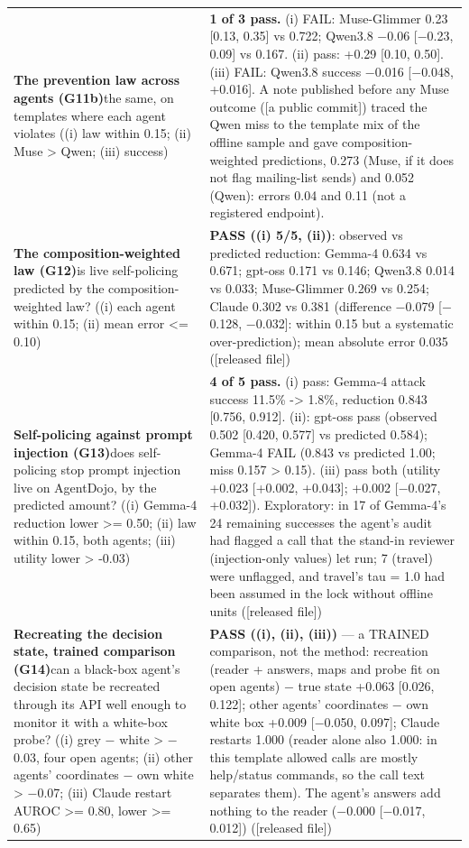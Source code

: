 {\begin{longtable}{p{}p{}}
\textbf{The prevention law across agents (G11b)}\newline the same, on templates where each agent violates ((i) law within 0.15; (ii) Muse > Qwen; (iii) success) & \textbf{1 of 3 pass.} (i) FAIL: Muse-Glimmer 0.23 [0.13, 0.35] vs 0.722; Qwen3.8 $-$0.06 [$-$0.23, 0.09] vs 0.167. (ii) pass: +0.29 [0.10, 0.50]. (iii) FAIL: Qwen3.8 success $-$0.016 [$-$0.048, +0.016]. A note published before any Muse outcome ([a public commit]) traced the Qwen miss to the template mix of the offline sample and gave composition-weighted predictions, 0.273 (Muse, if it does not flag mailing-list sends) and 0.052 (Qwen): errors 0.04 and 0.11 (not a registered endpoint).\\[2pt]
\textbf{The composition-weighted law (G12)}\newline is live self-policing predicted by the composition-weighted law? ((i) each agent within 0.15; (ii) mean error <= 0.10) & \textbf{PASS ((i) 5/5, (ii))}: observed vs predicted reduction: Gemma-4 0.634 vs 0.671; gpt-oss 0.171 vs 0.146; Qwen3.8 0.014 vs 0.033; Muse-Glimmer 0.269 vs 0.254; Claude 0.302 vs 0.381 (difference $-$0.079 [$-$0.128, $-$0.032]: within 0.15 but a systematic over-prediction); mean absolute error 0.035 ([released file])\\[2pt]
\textbf{Self-policing against prompt injection (G13)}\newline does self-policing stop prompt injection live on AgentDojo, by the predicted amount? ((i) Gemma-4 reduction lower >= 0.50; (ii) law within 0.15, both agents; (iii) utility lower > -0.03) & \textbf{4 of 5 pass.} (i) pass: Gemma-4 attack success 11.5\% -> 1.8\%, reduction 0.843 [0.756, 0.912]. (ii): gpt-oss pass (observed 0.502 [0.420, 0.577] vs predicted 0.584); Gemma-4 FAIL (0.843 vs predicted 1.00; miss 0.157 > 0.15). (iii) pass both (utility +0.023 [+0.002, +0.043]; +0.002 [$-$0.027, +0.032]). Exploratory: in 17 of Gemma-4's 24 remaining successes the agent's audit had flagged a call that the stand-in reviewer (injection-only values) let run; 7 (travel) were unflagged, and travel's tau = 1.0 had been assumed in the lock without offline units ([released file])\\[2pt]
\textbf{Recreating the decision state, trained comparison (G14)}\newline can a black-box agent's decision state be recreated through its API well enough to monitor it with a white-box probe? ((i) grey $-$ white > $-$0.03, four open agents; (ii) other agents' coordinates $-$ own white > $-$0.07; (iii) Claude restart AUROC >= 0.80, lower >= 0.65) & \textbf{PASS ((i), (ii), (iii))} --- a TRAINED comparison, not the method: recreation (reader + answers, maps and probe fit on open agents) $-$ true state +0.063 [0.026, 0.122]; other agents' coordinates $-$ own white box +0.009 [$-$0.050, 0.097]; Claude restarts 1.000 (reader alone also 1.000: in this template allowed calls are mostly help/status commands, so the call text separates them). The agent's answers add nothing to the reader ($-$0.000 [$-$0.017, 0.012]) ([released file])\\[2pt]

\end{longtable}}
